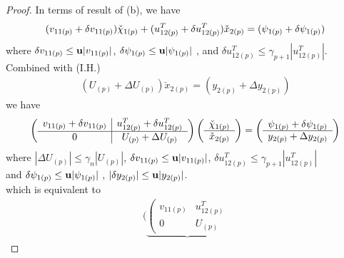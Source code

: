 \documentclass[11pt,a4paper]{article}
\begin{document}
\begin{itemize}
\begin{proof}
            In terms of result of (b), we have
            \begin{align}
                (v_{11(p)}+\delta v_{11(p)}) \check{\chi}_{1(p)}  
                + (u_{12(p)}^T + \delta u_{12(p)}^T) \check{x}_{2(p)}
                = (\psi_{1(p)} + \delta \psi_{1(p)} ) 
            \end{align}
            where $\delta v_{11(p)} \leq \mathbf{u}|v_{11(p)}|$, 
            $\delta \psi_{1(p)} \leq \mathbf{u} |\psi_{1(p)}|$ ,
            and $\delta u^T_{12(p)} \leq \gamma_{p+1} |u^T_{12(p)}| $.
            \\ Combined with (I.H.)
            \begin{align}
            (U_{(p)} + \Delta U_{(p)}) \check{x}_{2(p)} = (y_{2(p)} + \Delta y_{2(p)})
            \end{align}
            we have
            \begin{align}
                \left( \begin{array}{c|c}
                        v_{11(p)}+\delta v_{11(p)} &  u_{12(p)}^T + \delta u_{12(p)}^T \\\hline
                        0 & U_{(p)} + \Delta U_{(p)} 
                    \end{array} \right)
                \left( \begin{array}{c} \check{\chi}_{1(p)} \\\hline \check{x}_{2(p)} \end{array} \right)
                = 
                \left( \begin{array}{c} \psi_{1(p)} + \delta \psi_{1(p)}  \\\hline
                       y_{2(p)} + \Delta y_{2(p)} \end{array} \right)
            \end{align}
            where $|\Delta U_{(p)} | \leq \gamma_n |U_{(p)}|$,
            $\delta v_{11(p)} \leq \mathbf{u}|v_{11(p)}|$, 
            $\delta u^T_{12(p)} \leq \gamma_{p+1} |u^T_{12(p)}| $
            \\ and $\delta \psi_{1(p)} \leq \mathbf{u} |\psi_{1(p)}|$ ,
            $|\delta y_{2(p)}| \leq \mathbf{u} |y_{2(p)}|$.
            \\ which is equivalent to
            \begin{align}
                \Bigg(
                \underbrace{
                \left( \begin{array}{c|c}
                        v_{11(p)} &  u_{12(p)}^T  \\\hline
                        0 & U_{(p)} 

\end{array}}
\end{align}
\end{proof}
\end{itemize}
\end{document}
